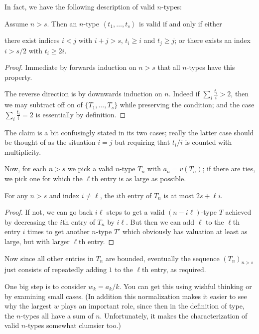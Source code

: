 In fact, we have the following description of valid $n$-types:
\begin{claim*}
  Assume $n > s$.
  Then an $n$-type $\left< t_1, \dots, t_s \right>$ is valid
  if and only if either
  \begin{itemize}
    \ii there exist indices $i < j$ with $i+j > s$,
    $t_i \ge i$ and $t_j \ge j$; or
    \ii there exists an index $i > s/2$
    with $t_i \ge 2i$.
  \end{itemize}
\end{claim*}
\begin{proof}
  Immediate by forwards induction on $n > s$
  that all $n$-types have this property.

  The reverse direction is by downwards induction on $n$.
  Indeed if $\sum_i \frac{t_i}{i} > 2$,
  then we may subtract off on of $\{T_1, \dots, T_s\}$
  while preserving the condition;
  and the case $\sum_i \frac{t_i}{i} = 2$
  is essentially by definition.
\end{proof}
\begin{remark*}
  The claim is a bit confusingly stated in its two cases;
  really the latter case should be thought of as the situation
  $i=j$ but requiring that $t_i/i$ is counted with multiplicity.
\end{remark*}

Now, for each $n > s$ we pick a valid $n$-type $T_n$
with $a_n = v(T_n)$;
if there are ties, we pick one for which the $\ell$th
entry is as large as possible.
\begin{claim*}
  For any $n > s$ and index $i \neq \ell$,
  the $i$th entry of $T_n$
  is at most $2s + \ell i$.
\end{claim*}
\begin{proof}
  If not, we can go back $i\ell$ steps to get
  a valid $(n-i\ell)$-type $T$
  achieved by decreasing the $i$th entry of $T_n$ by $i \ell$.
  But then we can add $\ell$ to the $\ell$th entry $i$
  times to get another $n$-type $T'$ which obviously
  has valuation at least as large,
  but with larger $\ell$th entry.
\end{proof}

Now since all other entries in $T_n$ are bounded,
eventually the sequence $(T_n)_{n > s}$
just consists of repeatedly
adding $1$ to the $\ell$th entry, as required.

\begin{remark*}
One big step is to consider $w_k = a_k / k$.
You can get this using wishful thinking
or by examining small cases.
(In addition this normalization makes it easier
to see why the largest $w$ plays an important role,
since then in the definition of type,
the $n$-types all have a sum of $n$.
Unfortunately, it makes the characterization
of valid $n$-types somewhat clumsier too.)
\end{remark*}
\pagebreak




